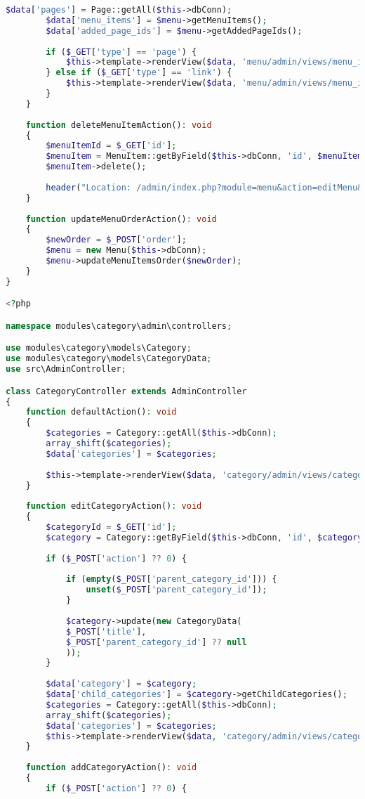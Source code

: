 \begin{lstlisting}[language=PHP, frame=none]
		$data['pages'] = Page::getAll($this->dbConn);
		$data['menu_items'] = $menu->getMenuItems();
		$data['added_page_ids'] = $menu->getAddedPageIds();
		
		if ($_GET['type'] == 'page') {
			$this->template->renderView($data, 'menu/admin/views/menu_item_add_page');
		} else if ($_GET['type'] == 'link') {
			$this->template->renderView($data, 'menu/admin/views/menu_item_add');
		}
	}
	
	function deleteMenuItemAction(): void
	{
		$menuItemId = $_GET['id'];
		$menuItem = MenuItem::getByField($this->dbConn, 'id', $menuItemId);
		$menuItem->delete();
		
		header("Location: /admin/index.php?module=menu&action=editMenu&id=$menuItem->menu_id");
	}
	
	function updateMenuOrderAction(): void
	{
		$newOrder = $_POST['order'];
		$menu = new Menu($this->dbConn);
		$menu->updateMenuItemsOrder($newOrder);
	}
}

<?php

namespace modules\category\admin\controllers;

use modules\category\models\Category;
use modules\category\models\CategoryData;
use src\AdminController;

class CategoryController extends AdminController
{
	function defaultAction(): void
	{
		$categories = Category::getAll($this->dbConn);
		array_shift($categories);
		$data['categories'] = $categories;
		
		$this->template->renderView($data, 'category/admin/views/category_list');
	}
	
	function editCategoryAction(): void
	{
		$categoryId = $_GET['id'];
		$category = Category::getByField($this->dbConn, 'id', $categoryId);
		
		if ($_POST['action'] ?? 0) {
			
			if (empty($_POST['parent_category_id'])) {
				unset($_POST['parent_category_id']);
			}
			
			$category->update(new CategoryData(
			$_POST['title'],
			$_POST['parent_category_id'] ?? null
			));
		}
		
		$data['category'] = $category;
		$data['child_categories'] = $category->getChildCategories();
		$categories = Category::getAll($this->dbConn);
		array_shift($categories);
		$data['categories'] = $categories;
		$this->template->renderView($data, 'category/admin/views/category_edit');
	}
	
	function addCategoryAction(): void
	{
		if ($_POST['action'] ?? 0) {
			

\end{lstlisting}
